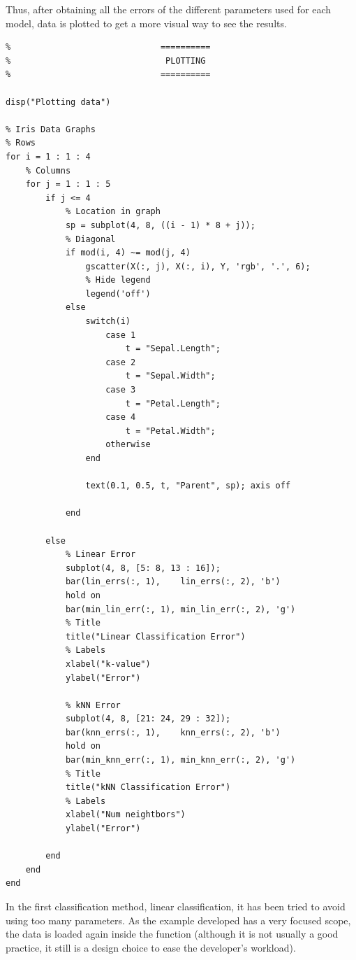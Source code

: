 \documentclass[11pt]{article}
\begin{document}
Thus, after obtaining all the errors of the different parameters used for each
model, data is plotted to get a more visual way to see the results.

\begin{verbatim}
%                              ==========
%                               PLOTTING
%                              ==========

disp("Plotting data")

% Iris Data Graphs
% Rows
for i = 1 : 1 : 4
    % Columns
    for j = 1 : 1 : 5
        if j <= 4
            % Location in graph
            sp = subplot(4, 8, ((i - 1) * 8 + j));
            % Diagonal             
            if mod(i, 4) ~= mod(j, 4)
                gscatter(X(:, j), X(:, i), Y, 'rgb', '.', 6);
                % Hide legend
                legend('off')
            else
                switch(i)
                    case 1
                        t = "Sepal.Length";
                    case 2
                        t = "Sepal.Width";
                    case 3
                        t = "Petal.Length";
                    case 4
                        t = "Petal.Width";
                    otherwise
                end

                text(0.1, 0.5, t, "Parent", sp); axis off

            end   
            
        else
            % Linear Error
            subplot(4, 8, [5: 8, 13 : 16]);
            bar(lin_errs(:, 1),    lin_errs(:, 2), 'b')
            hold on
            bar(min_lin_err(:, 1), min_lin_err(:, 2), 'g')
            % Title
            title("Linear Classification Error")
            % Labels
            xlabel("k-value")
            ylabel("Error")
            
            % kNN Error
            subplot(4, 8, [21: 24, 29 : 32]);
            bar(knn_errs(:, 1),    knn_errs(:, 2), 'b')
            hold on
            bar(min_knn_err(:, 1), min_knn_err(:, 2), 'g')
            % Title
            title("kNN Classification Error")
            % Labels
            xlabel("Num neightbors")
            ylabel("Error")
            
        end 
    end
end
\end{verbatim}

In the first classification method, linear classification, it has been tried to 
avoid using too many parameters. As the example developed has a very focused 
scope, the data is loaded again inside the function (although it is not usually 
a good practice, it still is a design choice to ease the developer's workload).
\end{document}
